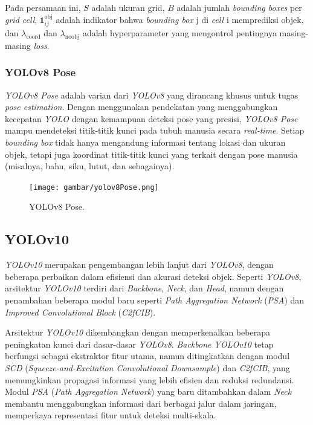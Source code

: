 Pada persamaan ini, \(S\) adalah ukuran grid, \(B\) adalah jumlah \emph{bounding boxes} per \emph{grid cell}, \(\mathbb{1}_{ij}^{\mathrm{obj}}\) adalah indikator bahwa \emph{bounding box} j di \emph{cell} i memprediksi objek, dan \(\lambda_{\mathrm{coord}}\) dan \(\lambda_{\mathrm{noobj}}\) adalah hyperparameter yang mengontrol pentingnya masing-masing \emph{loss}.
\newpage

\subsubsection{YOLOv8 Pose}
\label{subsubsec: YOLOv8 Pose}

\emph{YOLOv8 Pose} adalah varian dari \emph{YOLOv8} yang dirancang khusus untuk tugas \emph{pose estimation}. Dengan menggunakan pendekatan yang menggabungkan kecepatan \emph{YOLO} dengan kemampuan deteksi pose yang presisi, \emph{YOLOv8 Pose} mampu mendeteksi titik-titik kunci pada tubuh manusia secara \emph{real-time}. Setiap \emph{bounding box} tidak hanya mengandung informasi tentang lokasi dan ukuran objek, tetapi juga koordinat titik-titik kunci yang terkait dengan pose manusia (misalnya, bahu, siku, lutut, dan sebagainya).

\begin{figure}[H]
  \centering
  \texttt{[image: gambar/yolov8Pose.png]}
  \caption{YOLOv8 Pose.}
  \label{fig:Yolov8Pose}
\end{figure}

\subsection{YOLOv10}
\label{subsec:YOLOv10}

\emph{YOLOv10} merupakan pengembangan lebih lanjut dari \emph{YOLOv8}, dengan beberapa perbaikan dalam efisiensi dan akurasi deteksi objek. Seperti \emph{YOLOv8}, arsitektur \emph{YOLOv10} terdiri dari \emph{Backbone}, \emph{Neck}, dan \emph{Head}, namun dengan penambahan beberapa modul baru seperti \emph{Path Aggregation Network} (\emph{PSA}) dan \emph{Improved Convolutional Block} (\emph{C2fCIB}).

Arsitektur \emph{YOLOv10} dikembangkan dengan memperkenalkan beberapa peningkatan kunci dari dasar-dasar \emph{YOLOv8}. \emph{Backbone YOLOv10} tetap berfungsi sebagai ekstraktor fitur utama, namun ditingkatkan dengan modul \emph{SCD} (\emph{Squeeze-and-Excitation Convolutional Downsample}) dan \emph{C2fCIB}, yang memungkinkan propagasi informasi yang lebih efisien dan reduksi redundansi. Modul \emph{PSA} (\emph{Path Aggregation Network}) yang baru ditambahkan dalam \emph{Neck} membantu menggabungkan informasi dari berbagai jalur dalam jaringan, memperkaya representasi fitur untuk deteksi multi-skala.

